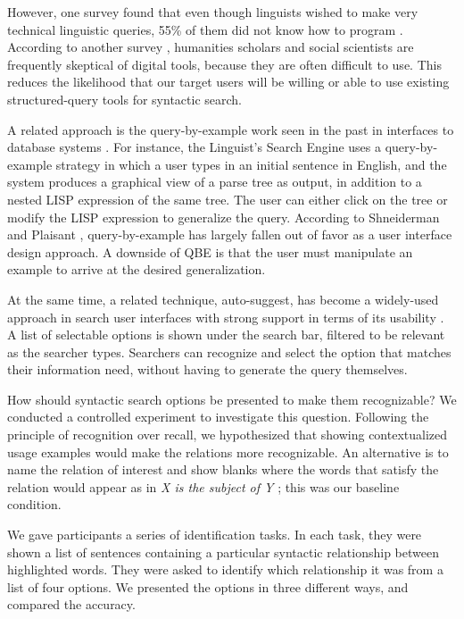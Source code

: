 However, one survey found that even though linguists wished to make very technical  linguistic queries, 55\% of them did not know how to program \cite{soehn2008requirements}. According to another survey \cite{gibbs_building_2012}, humanities scholars and social scientists are frequently skeptical of digital tools, because they are often difficult to use. This reduces the likelihood that our target users will be willing or able to use existing structured-query tools for syntactic search.

A related approach is the query-by-example work seen in the past in interfaces to database systems \cite{androutsopoulos1995natural}. For instance, the Linguist's Search Engine \cite{resnik2005web} uses a query-by-example strategy in which a user types in an initial sentence in English, and the system produces a graphical view of a parse tree as output, in addition to a nested LISP expression of the same tree.  The user can either click on the tree or modify the LISP expression to generalize the query. %
According to Shneiderman and Plaisant \cite{shneiderman2010designing}, query-by-example has largely fallen out of favor as a user interface design approach. A downside of QBE is that the user must manipulate an example to arrive at the desired generalization.

At the same time, a related technique, auto-suggest, has become a widely-used approach in search user interfaces with strong support in terms of its usability \cite{hearst2009search}. A list of selectable options is shown under the search bar, filtered to be relevant as the searcher types. Searchers can recognize and select the option that matches their information need, without having to generate the query themselves.

How should syntactic search options be presented to make them recognizable? We conducted a controlled experiment to investigate this question. Following the principle of recognition over recall, we hypothesized that showing contextualized usage examples would make the relations more recognizable. An alternative is to name the relation of interest and show blanks where the words that satisfy the relation would appear as in \emph{X is the subject of Y} \cite{muralidharan2013supporting}; this was our baseline condition.

We gave participants a series of identification tasks. In each task, they were shown a list of sentences containing a particular syntactic relationship between highlighted words. They were asked to identify which relationship it was from a list of four options. We presented the options in three different ways, and compared the accuracy.

